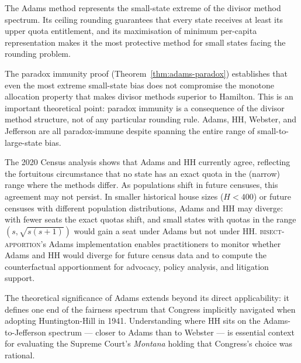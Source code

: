 The Adams method represents the small-state extreme of the divisor
method spectrum.
Its ceiling rounding guarantees that every state receives at least
its upper quota entitlement, and its maximisation of minimum
per-capita representation makes it the most protective method
for small states facing the rounding problem.

The paradox immunity proof (Theorem~\ref{thm:adams-paradox})
establishes that even the most extreme small-state bias does not
compromise the monotone allocation property that makes divisor methods
superior to Hamilton.
This is an important theoretical point: paradox immunity is a consequence
of the divisor method structure, not of any particular rounding rule.
Adams, HH, Webster, and Jefferson are all paradox-immune despite
spanning the entire range of small-to-large-state bias.

The 2020 Census analysis shows that Adams and HH currently agree,
reflecting the fortuitous circumstance that no state has an exact quota
in the (narrow) range where the methods differ.
As populations shift in future censuses, this agreement may not persist.
In smaller historical house sizes ($H < 400$) or future censuses with
different population distributions, Adams and HH may diverge: with fewer
seats the exact quotas shift, and small states with quotas in the range
$(s, \sqrt{s(s+1)})$ would gain a seat under Adams but not under HH.
\textsc{bisect-apportion}'s Adams implementation enables practitioners
to monitor whether Adams and HH would diverge for future census data
and to compute the counterfactual apportionment for advocacy,
policy analysis, and litigation support.

The theoretical significance of Adams extends beyond its direct applicability:
it defines one end of the fairness spectrum that Congress implicitly
navigated when adopting Huntington-Hill in 1941.
Understanding where HH sits on the Adams-to-Jefferson spectrum ---
closer to Adams than to Webster --- is essential context for
evaluating the Supreme Court's \textit{Montana} holding that
Congress's choice was rational.
